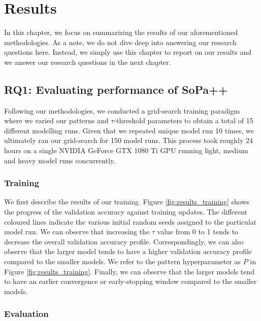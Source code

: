 \chapter{Results}

\label{chapter:results}

In this chapter, we focus on summarizing the results of our aforementioned
methodologies. As a note, we do not dive deep into answering our research
questions here. Instead, we simply use this chapter to report on our results and
we answer our research questions in the next chapter.

\section{RQ1: Evaluating performance of SoPa++}

Following our methodologies, we conducted a grid-search training paradigm where
we varied our patterns and $\tau$-threshold parameters to obtain a total of 15
different modelling runs. Given that we repeated unique model run 10 times, we
ultimately ran our grid-search for 150 model runs. This process took roughly 24
hours on a single NVIDIA GeForce GTX 1080 Ti GPU running light, medium and heavy
model runs concurrently.

\subsection{Training}

We first describe the results of our training. Figure \ref{fig:results_training}
shows the progress of the validation accuracy against training updates. The
different coloured lines indicate the various initial random seeds assigned to
the particulat model run. We can observe that increasing the $\tau$ value from 0
to 1 tends to decrease the overall validation accuracy profile. Correspondingly,
we can also observe that the larger model tends to have a higher validation
accuracy profile compared to the smaller models. We refer to the pattern
hyperparameter as $P$ in Figure \ref{fig:results_training}. Finally, we can
observe that the larger models tend to have an earlier convergence or
early-stopping window compared to the smaller models.

\subsection{Evaluation}

